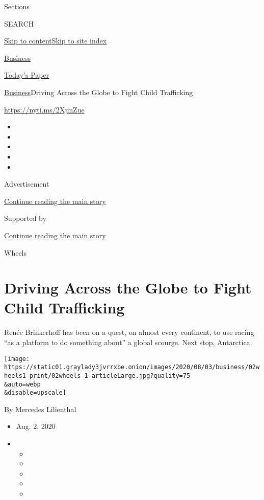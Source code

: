 Sections

SEARCH

\protect\hyperlink{site-content}{Skip to
content}\protect\hyperlink{site-index}{Skip to site index}

\href{https://www.nytimes3xbfgragh.onion/section/business}{Business}

\href{https://myaccount.nytimes3xbfgragh.onion/auth/login?response_type=cookie\&client_id=vi}{}

\href{https://www.nytimes3xbfgragh.onion/section/todayspaper}{Today's
Paper}

\href{/section/business}{Business}\textbar{}Driving Across the Globe to
Fight Child Trafficking

\url{https://nyti.ms/2XjmZue}

\begin{itemize}
\item
\item
\item
\item
\item
\end{itemize}

Advertisement

\protect\hyperlink{after-top}{Continue reading the main story}

Supported by

\protect\hyperlink{after-sponsor}{Continue reading the main story}

Wheels

\hypertarget{driving-across-the-globe-to-fight-child-trafficking}{%
\section{Driving Across the Globe to Fight Child
Trafficking}\label{driving-across-the-globe-to-fight-child-trafficking}}

Renée Brinkerhoff has been on a quest, on almost every continent, to use
racing ``as a platform to do something about'' a global scourge. Next
stop, Antarctica.

\texttt{[image: https://static01.graylady3jvrrxbe.onion/images/2020/08/03/business/02wheels1-print/02wheels-1-articleLarge.jpg?quality=75\\\&auto=webp\\\&disable=upscale]}

By Mercedes Lilienthal

\begin{itemize}
\item
  Aug. 2, 2020
\item
  \begin{itemize}
  \item
  \item
  \item
  \item
  \item
  \end{itemize}
\end{itemize}

